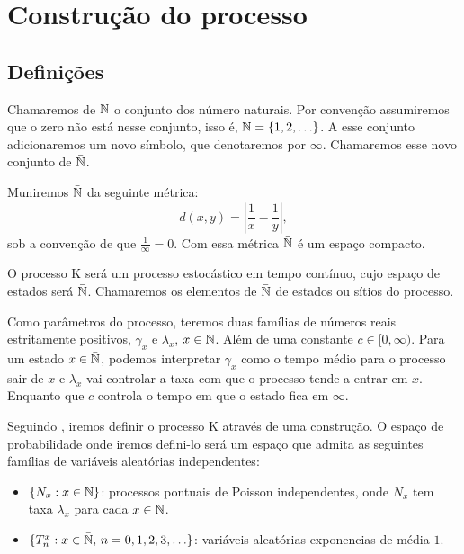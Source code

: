 \chapter{Construção do processo}
\label{cap:construcao}

\section{Definições}
\label{sec:definicoes}

Chamaremos de ${\mathbb{N}}$ o conjunto dos número naturais. Por convenção
assumiremos que o zero não está nesse conjunto, isso é, ${\mathbb{N}} = \{ 1, 2,
\ldots \}$. A esse conjunto adicionaremos um novo símbolo, que
denotaremos por $\infty$. Chamaremos esse novo conjunto de ${\bar{{\mathbb{N}}}}$.

Muniremos ${\bar{{\mathbb{N}}}}$ da seguinte métrica:
\begin{equation}
  \label{eq:metrica}
  d(x, y) = \left\lvert \frac{1}{x} - \frac{1}{y} \right\rvert,
\end{equation}
sob a convenção de que $\frac{1}{\infty} = 0$. Com essa métrica
${\bar{{\mathbb{N}}}}$ é um espaço compacto. 

O processo K será um processo estocástico em tempo contínuo, cujo
espaço de estados será ${\bar{{\mathbb{N}}}}$. Chamaremos os elementos de ${\bar{{\mathbb{N}}}}$ de
estados ou sítios do processo.

Como parâmetros do processo, teremos duas famílias de números reais
estritamente positivos, $\gamma_x$ e $\lambda_x$, $x \in {\mathbb{N}}$. Além de uma constante
$c \in [0, \infty)$.
Para um estado $x \in {\bar{{\mathbb{N}}}}$, podemos interpretar $\gamma_x$ como
o tempo médio para o processo sair de $x$ e $\lambda_x$
vai controlar a taxa com que o processo tende a entrar em
$x$. Enquanto que $c$ controla o tempo em que o estado
fica em $\infty$.

Seguindo \cite{fontes:08}, iremos definir o processo K através de uma
construção. O espaço de probabilidade onde iremos defini-lo será um
espaço que admita as seguintes famílias de variáveis aleatórias
independentes:

\begin{itemize}
  \item $\{ N_x: x \in {\mathbb{N}} \}$: processos pontuais de Poisson
    independentes, onde $N_x$ tem taxa $\lambda_x$ para cada $x \in {\mathbb{N}}$.
  \item $\{T_n^x: x \in {\bar{{\mathbb{N}}}} , \, n = 0, 1, 2, 3, \ldots \}$:
    variáveis aleatórias exponencias de média $1$.
\end{itemize}

